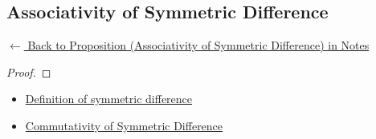 
\subsection*{Associativity of Symmetric Difference}
\label{prf:symmdiff-assoc}

\begin{remark*}[Return]
\hyperref[prop:symmdiff-assoc]{$\leftarrow$ Back to Proposition (Associativity of Symmetric Difference) in Notes}
\end{remark*}

\begin{proof}
\end{proof}

\begin{remark*}

\end{remark*}

\begin{remark*}[Dependencies]
\begin{itemize}
  \item \hyperref[def:set-operations]{Definition of symmetric difference}
  \item \hyperref[prop:symmdiff-comm]{Commutativity of Symmetric Difference}
\end{itemize}

\end{remark*}

